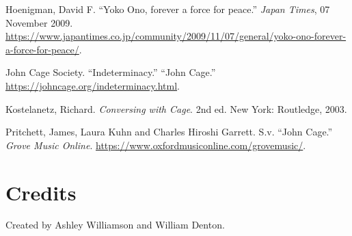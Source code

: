 \begin{mybiblist}


\item Hoenigman, David F.  ``Yoko Ono, forever a force for peace.'' \textit{Japan Times}, 07 November 2009. \url{https://www.japantimes.co.jp/community/2009/11/07/general/yoko-ono-forever-a-force-for-peace/}.

\item John Cage Society.  ``Indeterminacy.''  ``John Cage.'' \url{https://johncage.org/indeterminacy.html}.

\item Kostelanetz, Richard.  \textit{Conversing with Cage}.  2nd ed.  New York: Routledge, 2003.


\item Pritchett, James, Laura Kuhn and Charles Hiroshi Garrett.  S.v. ``John Cage.''  \textit{Grove Music Online}. \url{https://www.oxfordmusiconline.com/grovemusic/}.





\end{mybiblist}

\newpage

\section{Credits}

Created by Ashley Williamson and William Denton.

